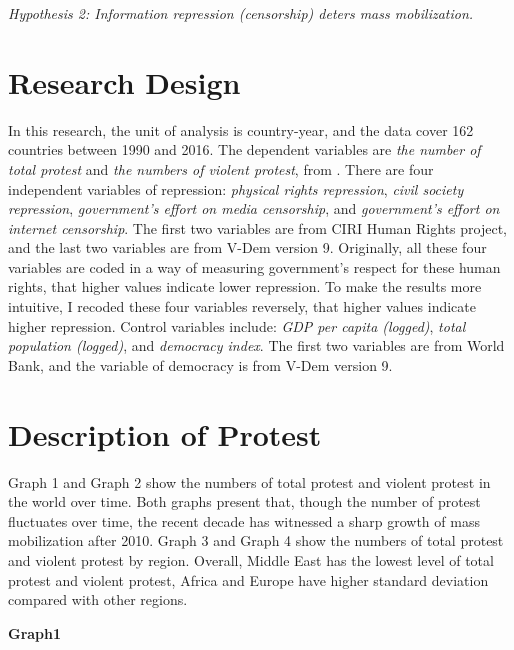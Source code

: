 \documentclass[11pt,]{article}
\begin{document}
\textit{Hypothesis 2: Information repression (censorship) deters mass mobilization.}

\vspace{3mm}

\section{Research Design}

In this research, the unit of analysis is country-year, and the data
cover 162 countries between 1990 and 2016. The dependent variables are
\textit{the number of total protest} and
\textit{the numbers of violent protest}, from \citet{ClarkandRegan2016}.
There are four independent variables of repression:
\textit{physical rights repression}, \textit{civil society repression},
\textit{government’s effort on media censorship}, and
\textit{government’s effort on internet censorship}. The first two
variables are from CIRI Human Rights project, and the last two variables
are from V-Dem version 9. Originally, all these four variables are coded
in a way of measuring government's respect for these human rights, that
higher values indicate lower repression. To make the results more
intuitive, I recoded these four variables reversely, that higher values
indicate higher repression. Control variables include:
\textit{GDP per capita (logged)}, \textit{total population (logged)},
and \textit{democracy index}. The first two variables are from World
Bank, and the variable of democracy is from V-Dem version 9.

\section{Description of Protest}

Graph 1 and Graph 2 show the numbers of total protest and violent
protest in the world over time. Both graphs present that, though the
number of protest fluctuates over time, the recent decade has witnessed
a sharp growth of mass mobilization after 2010. Graph 3 and Graph 4 show
the numbers of total protest and violent protest by region. Overall,
Middle East has the lowest level of total protest and violent protest,
Africa and Europe have higher standard deviation compared with other
regions.

\begin{center}
    \textbf{Graph1}
\end{center}
\end{document}
